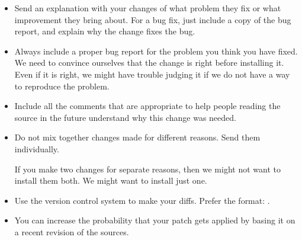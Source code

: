 \begin{itemize}
\item
  Send an explanation with your changes of what problem they fix or
  what improvement they bring about.  For a bug fix, just include a
  copy of the bug report, and explain why the change fixes the bug.

\item
  Always include a proper bug report for the problem you think you
  have fixed.  We need to convince ourselves that the change is right
  before installing it.  Even if it is right, we might have trouble
  judging it if we do not have a way to reproduce the problem.

\item
  Include all the comments that are appropriate to help people reading
  the source in the future understand why this change was needed.

\item
  Do not mix together changes made for different reasons.  Send them
  individually.

  If you make two changes for separate reasons, then we might not want
  to install them both.  We might want to install just one.

\item
  Use the version control system to make your diffs.  Prefer the
   format: .

\item
  You can increase the probability that your patch gets applied by
  basing it on a recent revision of the sources.
\end{itemize}

